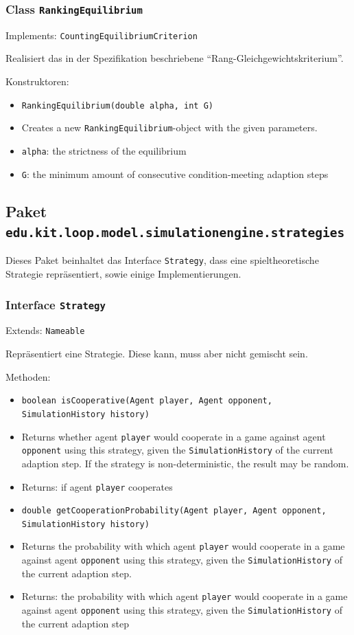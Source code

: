 \documentclass[parskip=full,11pt]{scrartcl}
\begin{document}
\subsubsection{Class \texttt{RankingEquilibrium}}
Implements: \texttt{CountingEquilibriumCriterion}

Realisiert das in der Spezifikation beschriebene \enquote{Rang-Gleichgewichtskriterium}.

Konstruktoren:
\begin{itemize}\itemsep -10pt
\item \texttt{RankingEquilibrium(double alpha, int G)}
\item[] Creates a new \texttt{RankingEquilibrium}-object with the given parameters.
\item[] \texttt{alpha}: the strictness of the equilibrium
\item[] \texttt{G}: the minimum amount of consecutive condition-meeting adaption steps
\end{itemize}

\subsection{Paket \texttt{edu.kit.loop.model.simulationengine.strategies}}
Dieses Paket beinhaltet das Interface \texttt{Strategy}, dass eine spieltheoretische Strategie repräsentiert, sowie einige Implementierungen.



\subsubsection{Interface \texttt{Strategy}}
Extends: \texttt{Nameable}

Repräsentiert eine Strategie. Diese kann, muss aber nicht gemischt sein.

Methoden:
\begin{itemize}\itemsep -10pt
\item \texttt{boolean isCooperative(Agent player, Agent opponent, SimulationHistory history)}
\item[] Returns whether agent \texttt{player} would cooperate in a game against agent \texttt{opponent} using this strategy, given the \texttt{SimulationHistory} of the current adaption step. If the strategy is non-deterministic, the result may be random.
\item[] Returns: if agent \texttt{player} cooperates

\item \texttt{double getCooperationProbability(Agent player, Agent opponent, SimulationHistory history)}
\item[] Returns the probability with which agent \texttt{player} would cooperate in a game against agent \texttt{opponent} using this strategy, given the \texttt{SimulationHistory} of the current adaption step.
\item[] Returns: the probability with which agent \texttt{player} would cooperate in a game against agent \texttt{opponent} using this strategy, given the \texttt{SimulationHistory} of the current adaption step
\end{itemize}
\end{document}
